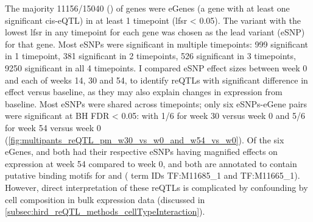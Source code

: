 
The majority 11156/15040 () of genes were eGenes (a gene with at least one significant cis-eQTL) in at least 1 timepoint (\gls{lfsr} < 0.05).
The variant with the lowest lfsr in any timepoint for each gene was 
chosen as the lead variant (eSNP) for that gene.
Most eSNPs were significant in multiple timepoints: 999 significant in 1 timepoint, 381 significant in 2 timepoints, 526 significant in 3 timepoints, 9250 significant in all 4 timepoints.
I compared eSNP effect sizes between week 0 and each of weeks 14, 30 and 54,
to identify \glspl{reQTL} with significant difference in effect versus baseline,
as they may also explain changes in expression from baseline.
Most eSNPs were shared across timepoints;
only six eSNPs-eGene pairs were significant at BH FDR < 0.05:
with 1/6 for week 30 versus week 0 and 5/6 for week 54 versus week 0 (\autoref{fig:multipants_reQTL_pm_w30_vs_w0_and_w54_vs_w0}).
Of the six eGenes,  and  both had their respective eSNPs having magnified effects on expression at week 54 compared to week 0,
and both are annotated to contain putative binding motifs for  and  ( term IDs TF:M11685\_1 and TF:M11665\_1).
However, direct interpretation of these reQTLs is complicated by confounding  by cell composition in bulk expression data (discussed in \autoref{subsec:hird_reQTL_methods_cellTypeInteraction}).


